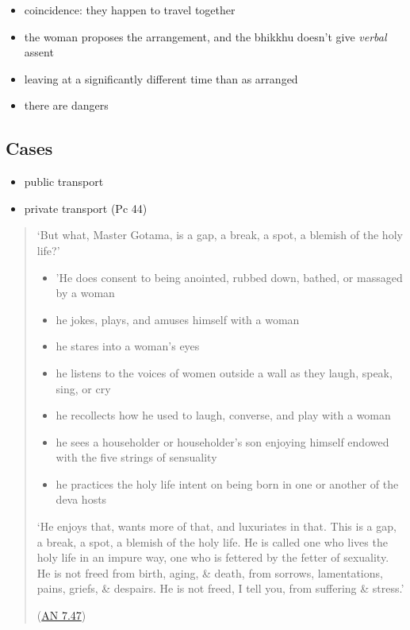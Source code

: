 \begin{itemize}
\tightlist
\item
  coincidence: they happen to travel together
\item
  the woman proposes the arrangement, and the bhikkhu doesn't give
  \emph{verbal} assent
\item
  leaving at a significantly different time than as arranged
\item
  there are dangers
\end{itemize}

\subsection{Cases}

\begin{itemize}
\tightlist
\item
  public transport
\item
  private transport (Pc 44)
\end{itemize}

\clearpage

\begin{quote}
`But what, Master Gotama, is a gap, a break, a spot, a blemish of the
holy life?'

\begin{itemize}
\tightlist
\item
  'He does consent to being anointed, rubbed down, bathed, or massaged
  by a woman
\item
  he jokes, plays, and amuses himself with a woman
\item
  he stares into a woman's eyes
\item
  he listens to the voices of women outside a wall as they laugh, speak,
  sing, or cry
\item
  he recollects how he used to laugh, converse, and play with a woman
\item
  he sees a householder or householder's son enjoying himself endowed
  with the five strings of sensuality
\item
  he practices the holy life intent on being born in one or another of
  the deva hosts
\end{itemize}

`He enjoys that, wants more of that, and luxuriates in that. This is a
gap, a break, a spot, a blemish of the holy life. He is called one who
lives the holy life in an impure way, one who is fettered by the fetter
of sexuality. He is not freed from birth, aging, \& death, from sorrows,
lamentations, pains, griefs, \& despairs. He is not freed, I tell you,
from suffering \& stress.'

(\href{https://www.dhammatalks.org/suttas/AN/AN7_47.html}{AN 7.47})
\end{quote}

